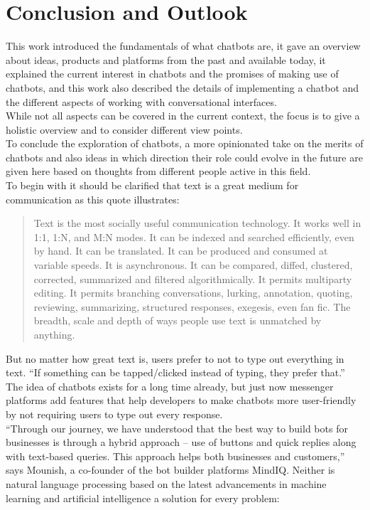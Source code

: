 \chapter{Conclusion and Outlook}


This work introduced the fundamentals of what chatbots are,
it gave an overview about ideas, products and platforms from the past and available today,
it explained the current interest in chatbots and the promises of making use of chatbots,
and this work also described the details of implementing a chatbot and the different aspects of working with conversational interfaces.
\\

While not all aspects can be covered in the current context,
the focus is to give a holistic overview and to consider different view points.
\\

To conclude the exploration of chatbots, a more opinionated take on the merits of chatbots
and also ideas in which direction their role could evolve in the future are given here
based on thoughts from different people active in this field.
\\

To begin with it should be clarified that text is a great medium for communication as this quote\cite{futuretext} illustrates:

\begin{quote}
Text is the most socially useful communication technology. It works well in 1:1, 1:N, and M:N modes. It can be indexed and searched efficiently, even by hand. It can be translated. It can be produced and consumed at variable speeds. It is asynchronous. It can be compared, diffed, clustered, corrected, summarized and filtered algorithmically. It permits multiparty editing. It permits branching conversations, lurking, annotation, quoting, reviewing, summarizing, structured responses, exegesis, even fan fic. The breadth, scale and depth of ways people use text is unmatched by anything.
\end{quote}

But no matter how great text is, users prefer to not to type out everything in text.
``If something can be tapped/clicked instead of typing, they prefer that.''\cite{chatbotslife}
\\
The idea of chatbots exists for a long time already,
but just now messenger platforms add features that help developers to make chatbots more user-friendly by not requiring users to type out every response.
\\
``Through our journey, we have understood that the best way to build bots for businesses is through a hybrid approach – use of buttons and quick replies along with text-based queries. This approach helps both businesses and customers,'' says Mounish, a co-founder of the bot builder platforms MindIQ.\cite{techinasia}
Neither is natural language processing based on the latest advancements in machine learning and artificial intelligence a solution for every problem\cite{neednlp}:

